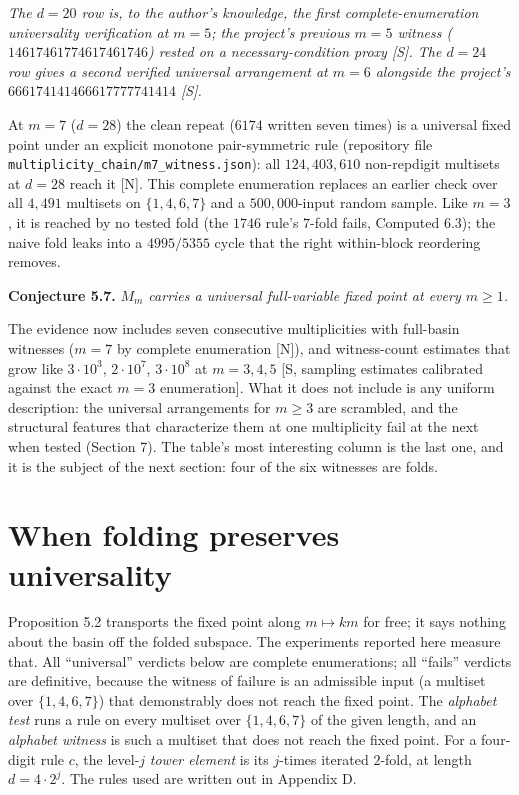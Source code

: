 \documentclass[11pt,letterpaper]{article}
\theoremstyle{paperstyle}
\theoremstyle{paperstyledef}
\theoremstyle{paperstylerem}
\begin{document}
\emph{The \(d = 20\) row is, to the author's knowledge, the first complete-enumeration universality verification at \(m = 5\); the project's previous \(m=5\) witness (\(14617461774617461746\)) rested on a necessary-condition proxy {[}S{]}. The \(d=24\) row gives a second verified universal arrangement at \(m = 6\) alongside the project's \(666174141466617777741414\) {[}S{]}.}

At \(m = 7\) (\(d = 28\)) the clean repeat (\(6174\) written seven times) is a universal fixed point under an explicit monotone pair-symmetric rule (repository file \texttt{multiplicity\_chain/m7\_witness.json}): all \(124{,}403{,}610\) non-repdigit multisets at \(d = 28\) reach it {[}N{]}. This complete enumeration replaces an earlier check over all \(4{,}491\) multisets on \(\{1,4,6,7\}\) and a \(500{,}000\)-input random sample. Like \(m = 3\), it is reached by no tested fold (the \(1746\) rule's \(7\)-fold fails, Computed 6.3); the naive fold leaks into a \(4995/5355\) cycle that the right within-block reordering removes.

\textbf{Conjecture 5.7.} \emph{\(M_m\) carries a universal full-variable fixed point at every \(m \geq 1\).}

The evidence now includes seven consecutive multiplicities with full-basin witnesses (\(m = 7\) by complete enumeration {[}N{]}), and witness-count estimates that grow like \(3\cdot 10^3\), \(2 \cdot 10^7\), \(3\cdot 10^8\) at \(m = 3, 4, 5\) {[}S, sampling estimates calibrated against the exact \(m=3\) enumeration{]}. What it does not include is any uniform description: the universal arrangements for \(m \geq 3\) are scrambled, and the structural features that characterize them at one multiplicity fail at the next when tested (Section 7). The table's most interesting column is the last one, and it is the subject of the next section: four of the six witnesses are folds.

\section{When folding preserves universality}\label{when-folding-preserves-universality}

Proposition 5.2 transports the fixed point along \(m \mapsto km\) for free; it says nothing about the basin off the folded subspace. The experiments reported here measure that. All ``universal'' verdicts below are complete enumerations; all ``fails'' verdicts are definitive, because the witness of failure is an admissible input (a multiset over \(\{1,4,6,7\}\)) that demonstrably does not reach the fixed point. The \emph{alphabet test} runs a rule on every multiset over \(\{1,4,6,7\}\) of the given length, and an \emph{alphabet witness} is such a multiset that does not reach the fixed point. For a four-digit rule \(c\), the level-\(j\) \emph{tower element} is its \(j\)-times iterated \(2\)-fold, at length \(d = 4 \cdot 2^j\). The rules used are written out in Appendix D.
\end{document}
